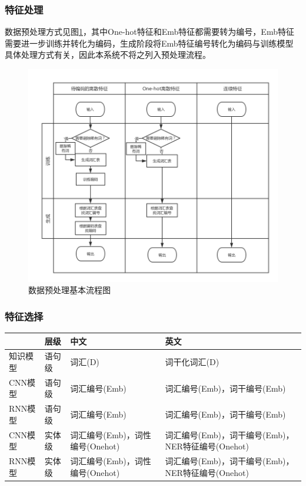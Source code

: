 \subsubsection{特征处理}
数据预处理方式见图\ref{featureprocessing}，其中One-hot特征和Emb特征都需要转为编号，Emb特征需要进一步训练并转化为编码，生成阶段将Emb特征编号转化为编码与训练模型具体处理方式有关，因此本系统不将之列入预处理流程。
\begin{figure}[!hbp]
\begin{center}
\includegraphics[width=\textwidth]{graphic/featurepocessing.png}
\caption{数据预处理基本流程图 \label{featureprocessing}}
\end{center}
\end{figure}
\subsubsection{特征选择}
\begin{center}
\begin{tabu}to \textwidth{X|X|X[3]|X[3]} 
\hline
& 层级 & 中文 & 英文\\
\hline
知识模型 & 语句级 & 词汇(D) & 词干化词汇(D)\\
\hline
CNN模型 & 语句级 & 词汇编号(Emb) & 词汇编号(Emb)，词干编号(Emb)\\
\hline
RNN模型 & 语句级 & 词汇编号(Emb) & 词汇编号(Emb)，词干编号(Emb)\\
\hline
CNN模型 & 实体级 & 词汇编号(Emb)，词性编号(Onehot) & 词汇编号(Emb)，词干编号(Emb)，NER特征编号(Onehot)\\
\hline
RNN模型 & 实体级 & 词汇编号(Emb)，词性编号(Onehot) & 词汇编号(Emb)，词干编号(Emb)，NER特征编号(Onehot)\\
\hline
\end{tabu}
\end{center}

